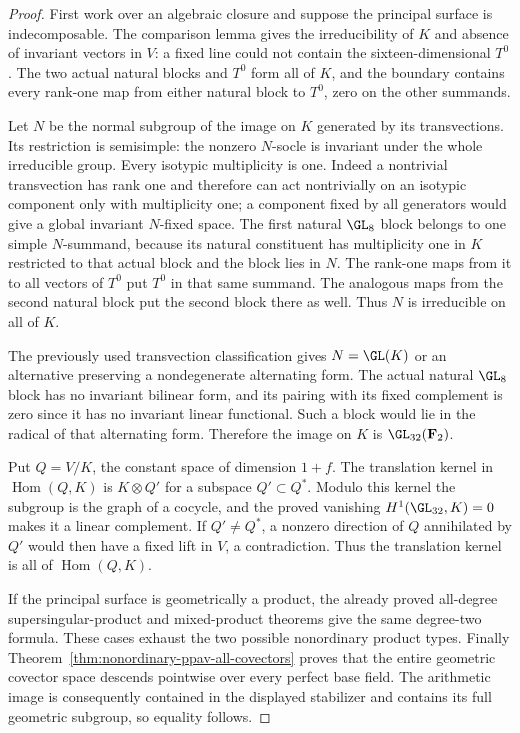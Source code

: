 \begin{proof}
First work over an algebraic closure and suppose the principal
surface is indecomposable. The comparison lemma gives the
irreducibility of $K$ and absence of invariant vectors in $V$:
a fixed line could not contain the sixteen-dimensional $T^0$.
The two actual natural blocks and $T^0$ form all of $K$, and
the boundary contains every rank-one map from either natural
block to $T^0$, zero on the other summands.

Let $N$ be the normal subgroup of the image on $K$ generated
by its transvections. Its restriction is semisimple: the
nonzero $N$-socle is invariant under the whole irreducible
group. Every isotypic multiplicity is one. Indeed a nontrivial
transvection has rank one and therefore can act nontrivially
on an isotypic component only with multiplicity one; a component
fixed by all generators would give a global invariant
$N$-fixed space. The first natural $\GL_8$ block belongs to
one simple $N$-summand, because its natural constituent has
multiplicity one in $K$ restricted to that actual block and
the block lies in $N$. The rank-one maps from it to all vectors
of $T^0$ put $T^0$ in that same summand. The analogous maps
from the second natural block put the second block there as
well. Thus $N$ is irreducible on all of $K$.

The previously used transvection classification
\cite[Theorem~3.6, printed p.~22]{KantorSeress2001} gives
$N=\GL(K)$ or an alternative preserving a nondegenerate
alternating form. The actual natural $\GL_8$ block has no
invariant bilinear form, and its pairing with its fixed
complement is zero since it has no invariant linear functional.
Such a block would lie in the radical of that alternating
form. Therefore the image on $K$ is $\GL_{32}(\mathbf F_2)$.

Put $Q=V/K$, the constant space of dimension $1+f$. The
translation kernel in $\operatorname{Hom}(Q,K)$ is
$K\otimes Q'$ for a subspace $Q'\subset Q^*$. Modulo this
kernel the subgroup is the graph of a cocycle, and the proved
vanishing $H^1(\GL_{32},K)=0$ makes it a linear complement.
If $Q'\ne Q^*$, a nonzero direction of $Q$ annihilated by
$Q'$ would then have a fixed lift in $V$, a contradiction.
Thus the translation kernel is all of $\operatorname{Hom}(Q,K)$.

If the principal surface is geometrically a product, the
already proved all-degree supersingular-product and mixed-product
theorems give the same degree-two formula. These cases exhaust
the two possible nonordinary product types. Finally
Theorem~\ref{thm:nonordinary-ppav-all-covectors} proves that the
entire geometric covector space descends pointwise over every
perfect base field. The arithmetic image is consequently
contained in the displayed stabilizer and contains its full
geometric subgroup, so equality follows.
\end{proof}

